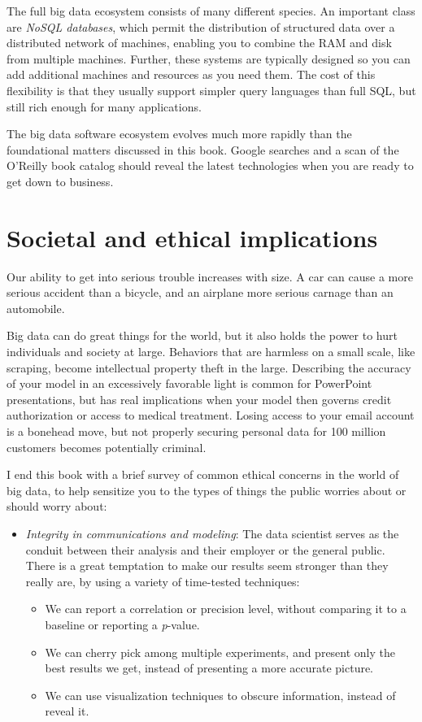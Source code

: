\documentclass[10pt]{article}
\begin{document}
\begin{enumerate}
The full big data ecosystem consists of many different species. An important class are \textit{NoSQL databases}, which permit the distribution of structured data over a distributed network of machines, enabling you to combine the RAM and disk from multiple machines. Further, these systems are typically designed so you can add additional machines and resources as you need them. The cost of this flexibility is that they usually support simpler query languages than full SQL, but still rich enough for many applications.

The big data software ecosystem evolves much more rapidly than the foundational matters discussed in this book. Google searches and a scan of the O'Reilly book catalog should reveal the latest technologies when you are ready to get down to business.

\section*{Societal and ethical implications}
Our ability to get into serious trouble increases with size. A car can cause a more serious accident than a bicycle, and an airplane more serious carnage than an automobile.

Big data can do great things for the world, but it also holds the power to hurt individuals and society at large. Behaviors that are harmless on a small scale, like scraping, become intellectual property theft in the large. Describing the accuracy of your model in an excessively favorable light is common for PowerPoint presentations, but has real implications when your model then governs credit authorization or access to medical treatment. Losing access to your email account is a bonehead move, but not properly securing personal data for 100 million customers becomes potentially criminal.

I end this book with a brief survey of common ethical concerns in the world of big data, to help sensitize you to the types of things the public worries about or should worry about:

\begin{itemize}
  \item \textit{Integrity in communications and modeling}: The data scientist serves as the conduit between their analysis and their employer or the general public. There is a great temptation to make our results seem stronger than they really are, by using a variety of time-tested techniques:
  \begin{itemize}
    \item We can report a correlation or precision level, without comparing it to a baseline or reporting a \textit{p}-value.
    \item We can cherry pick among multiple experiments, and present only the best results we get, instead of presenting a more accurate picture.
    \item We can use visualization techniques to obscure information, instead of reveal it.
  \end{itemize}
\end{itemize}


\end{enumerate}
\end{document}
